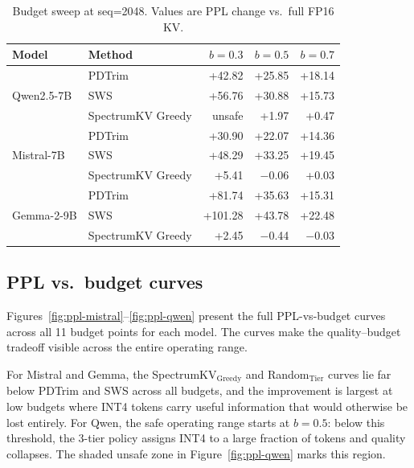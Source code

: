 \documentclass[11pt]{article}
\newcommand{\method}{SpectrumKV}
\newcommand{\budget}{b}
\theoremstyle{plain}
\theoremstyle{definition}
\begin{document}
\begin{table}[t]
\centering
\caption{Budget sweep at seq=2048.  Values are PPL change vs.\ full FP16 KV.}
\label{tab:budget}
\small
\begin{tabular}{llrrr}
\toprule
Model & Method & $\budget=0.3$ & $\budget=0.5$ & $\budget=0.7$ \\
\midrule
\multirow{3}{*}{Qwen2.5-7B}
  & PDTrim & +42.82 & +25.85 & +18.14 \\
  & SWS & +56.76 & +30.88 & +15.73 \\
  & \method{} Greedy & unsafe & +1.97 & +0.47 \\
\midrule
\multirow{3}{*}{Mistral-7B}
  & PDTrim & +30.90 & +22.07 & +14.36 \\
  & SWS & +48.29 & +33.25 & +19.45 \\
  & \method{} Greedy & +5.41 & $-$0.06 & +0.03 \\
\midrule
\multirow{3}{*}{Gemma-2-9B}
  & PDTrim & +81.74 & +35.63 & +15.31 \\
  & SWS & +101.28 & +43.78 & +22.48 \\
  & \method{} Greedy & +2.45 & $-$0.44 & $-$0.03 \\
\bottomrule
\end{tabular}
\end{table}

\subsection{PPL vs.\ budget curves}
\label{sec:ppl-curves}

Figures~\ref{fig:ppl-mistral}--\ref{fig:ppl-qwen} present the full PPL-vs-budget curves across all 11 budget points for each model.  The curves make the quality--budget tradeoff visible across the entire operating range.

For Mistral and Gemma, the \method{}$_{\text{Greedy}}$ and Random$_{\text{Tier}}$ curves lie far below PDTrim and SWS across all budgets, and the improvement is largest at low budgets where INT4 tokens carry useful information that would otherwise be lost entirely.  For Qwen, the safe operating range starts at $\budget=0.5$: below this threshold, the 3-tier policy assigns INT4 to a large fraction of tokens and quality collapses.  The shaded unsafe zone in Figure~\ref{fig:ppl-qwen} marks this region.
\end{document}
